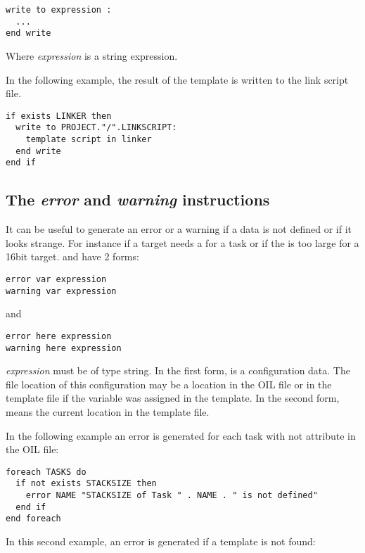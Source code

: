 \begin{lstlisting}
write to expression :
  ...
end write
\end{lstlisting}

Where {\em expression} is a string expression.

In the following example, the result of the  template is written to the link script file.

\begin{lstlisting}
if exists LINKER then
  write to PROJECT."/".LINKSCRIPT:
    template script in linker
  end write
end if
\end{lstlisting}


\subsection{The {\em error} and {\em warning} instructions}

It can be useful to generate an error or a warning if a data is not defined or if it looks strange. For instance if a target needs a  for a task or if the  is too large for a 16bit target.  and  have 2 forms:

\begin{lstlisting}
error var expression
warning var expression
\end{lstlisting}

and

\begin{lstlisting}
error here expression
warning here expression
\end{lstlisting}

{\em expression} must be of type string. In the first form,  is a configuration data. The file location of this configuration may be a location in the OIL file or in the template file if the variable was assigned in the template. In the second form,  means the current location in the template file.

In the following example an error is generated for each task with not  attribute in the OIL file:

\begin{lstlisting}
foreach TASKS do
  if not exists STACKSIZE then
    error NAME "STACKSIZE of Task " . NAME . " is not defined"
  end if
end foreach
\end{lstlisting}

In this second example, an error is generated if a template is not found:

